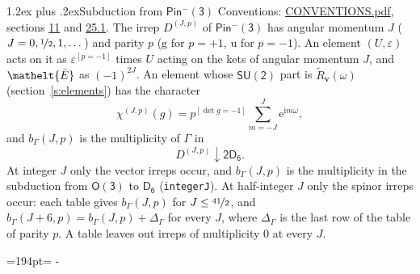 \documentclass[10pt,a4paper]{article}
\makeatletter
\renewcommand\section{\@startsection{section}{1}{\z@}{-3ex plus -1ex minus -.2ex}%
  {1.2ex plus .2ex}{\normalfont\large\sffamily\bfseries\color{parttitle}}}
\newcommand{\needspace}[1]{\par\penalty-100\begingroup\dimen0=#1\relax\dimen2=\pagegoal
  \advance\dimen2-\pagetotal\ifdim\dimen0>\dimen2\relax\ifdim\dimen2>0pt\vfil\break\fi\fi
  \endgroup}
\numberwithin{equation}{section}
\newcommand{\eltfont}[1]{{\let\sigma\eltsigma\mathelt{#1}}}
\newcommand{\grp}[1]{\mathsf{#1}}
\newcommand{\elt}[1]{\eltfont{#1}}
\newcommand{\ptag}[1]{\mathrm{#1}}
\newcommand{\iverson}[1]{[#1]}
\newcommand{\restr}[2]{#1\!\downarrow#2}
\newcommand{\vv}{\mathbf{v}}
\newcommand{\iunit}{\mathrm{i}}
\newcommand{\expe}{\mathrm{e}}
\newcommand{\irrJp}[2]{D^{(#1,#2)}}
\newcommand{\barred}[1]{\bar{#1}}
\newcommand{\lift}[1]{\tilde{#1}}
\makeatother
\begin{document}
\section{Subduction from \texorpdfstring{$\grp{Pin^{-}(3)}$}{Pin(3)}}\label{s:subduction_parent}
Conventions: \href{../../CONVENTIONS.pdf}{CONVENTIONS.pdf}, sections \href{../../../rotation/CONVENTIONS.pdf\#conv.11}{11} and \href{../../CONVENTIONS.pdf\#conv.25.1}{25.1}.
\leavevmode\label{n:index.J}\label{n:index.parity}\label{n:irrep.o3}The irrep $\irrJp{J}{p}$ of \href{Pinminus3.pdf}{$\grp{Pin^{-}(3)}$} has angular momentum $J$ ($J = 0, \nicefrac{1}{2}, 1, \dots$) and parity $p$ ($\ptag{g}$ for $p = +1$, $\ptag{u}$ for $p = -1$). An element $(U, \varepsilon)$ acts on it as $\varepsilon^{[p = -1]}$ times $U$ acting on the kets of angular momentum $J$, and $\elt{\barred{E}}$ as $(-1)^{2J}$. \label{n:function.character.parent}\label{n:function.multiplicity}An element whose $\grp{SU(2)}$ part is $\lift{R}_{\vv}(\omega)$ (section~\ref{s:elements}) has the character
\begin{equation}\label{e:chi}\chi^{(J,p)}(g) = p^{\iverson{\det g = -1}}\sum_{m=-J}^{J} \expe^{\iunit m\omega},\end{equation}
and $b_\Gamma(J, p)$ is the multiplicity of $\Gamma$ in
\begin{equation}\label{e:parent}\restr{\irrJp{J}{p}}{\grp{2D_{6}}}.\end{equation}
At integer $J$ only the vector irreps occur, and $b_\Gamma(J, p)$ is the multiplicity in the subduction from $\grp{O(3)}$ to \href{../../../rotation/data/pdf/D6.pdf}{$\grp{D_{6}}$} (\texttt{integerJ}). \label{n:index.increment}At half-integer $J$ only the spinor irreps occur: each table gives $b_\Gamma(J, p)$ for $J \le \nicefrac{41}{2}$, and $b_\Gamma(J + 6, p) = b_\Gamma(J, p) + \Delta_\Gamma$ for every $J$, where $\Delta_\Gamma$ is the last row of the table of parity $p$. A table leaves out irreps of multiplicity 0 at every $J$.
\needspace{194pt}
\end{document}
